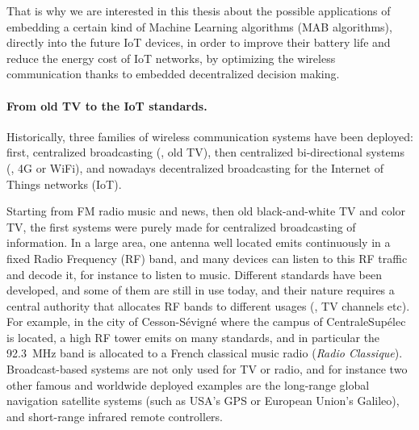 That is why we are interested in this thesis about the possible applications of embedding a certain kind of Machine Learning algorithms (MAB algorithms),
directly into the future IoT devices, in order to improve their battery life and reduce the energy cost of IoT networks, by optimizing the wireless communication thanks to embedded decentralized decision making.


\paragraph{From old TV to the IoT standards.}
%
Historically, three families of wireless communication systems have been deployed: first, centralized broadcasting (\eg, old TV), then centralized bi-directional systems (\eg, 4G or WiFi), and nowadays decentralized broadcasting for the Internet of Things networks (IoT).

Starting from FM radio music and news, then old black-and-white TV and color TV, the first systems were purely made for centralized broadcasting of information. In a large area, one antenna well located emits continuously in a fixed Radio Frequency (RF) band, and many devices can listen to this RF traffic and decode it, for instance to listen to music.
Different standards have been developed, and some of them are still in use today, and their nature requires a central authority that allocates RF bands to different usages (\eg, TV channels etc).
For example, in the city of Cesson-Sévigné where the campus of CentraleSupélec is located, a high RF tower emits on many standards, and in particular the \SI{92.3}{\mega\hertz} band is allocated to a French classical music radio (\emph{Radio Classique}).
Broadcast-based systems are not only used for TV or radio,
and for instance two other famous and worldwide deployed examples are the long-range global navigation satellite systems (such as USA's GPS or European Union's Galileo), and short-range infrared remote controllers.

